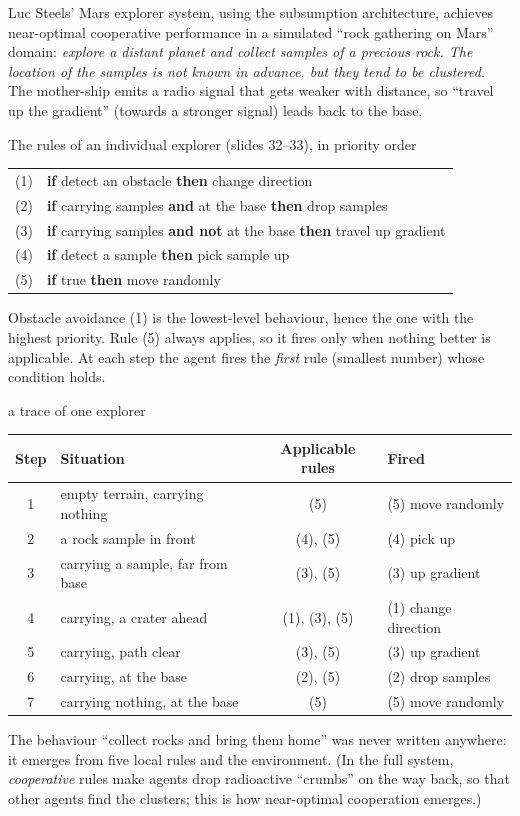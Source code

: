 Luc Steels' Mars explorer system, using the subsumption architecture, achieves near-optimal
cooperative performance in a simulated ``rock gathering on Mars'' domain: \emph{explore a
distant planet and collect samples of a precious rock. The location of the samples is not
known in advance, but they tend to be clustered.} The mother-ship emits a radio signal that
gets weaker with distance, so ``travel up the gradient'' (towards a stronger signal) leads
back to the base.

\begin{nbfact}{The rules of an individual explorer (slides 32--33), in priority order}
\begin{center}
\begin{tabular}{@{}c l@{}}
(1) & \textbf{if} detect an obstacle \textbf{then} change direction \\
(2) & \textbf{if} carrying samples \textbf{and} at the base \textbf{then} drop samples \\
(3) & \textbf{if} carrying samples \textbf{and not} at the base \textbf{then} travel up gradient \\
(4) & \textbf{if} detect a sample \textbf{then} pick sample up \\
(5) & \textbf{if} true \textbf{then} move randomly
\end{tabular}
\end{center}
Obstacle avoidance (1) is the lowest-level behaviour, hence the one with the highest
priority. Rule (5) always applies, so it fires only when nothing better is applicable.
At each step the agent fires the \emph{first} rule (smallest number) whose condition holds.
\end{nbfact}

\begin{nbexample}{a trace of one explorer}
\notinslides
\small
\begin{tabularx}{\linewidth}{@{}c X c l@{}}
\toprule
\textbf{Step} & \textbf{Situation} & \textbf{Applicable rules} & \textbf{Fired} \\
\midrule
1 & empty terrain, carrying nothing & (5) & (5) move randomly \\
2 & a rock sample in front & (4), (5) & (4) pick up \\
3 & carrying a sample, far from base & (3), (5) & (3) up gradient \\
4 & carrying, a crater ahead & (1), (3), (5) & (1) change direction \\
5 & carrying, path clear & (3), (5) & (3) up gradient \\
6 & carrying, at the base & (2), (5) & (2) drop samples \\
7 & carrying nothing, at the base & (5) & (5) move randomly \\
\bottomrule
\end{tabularx}
The behaviour ``collect rocks and bring them home'' was never written anywhere: it emerges
from five local rules and the environment. (In the full system, \emph{cooperative} rules make
agents drop radioactive ``crumbs'' on the way back, so that other agents find the clusters;
this is how near-optimal cooperation emerges.)
\end{nbexample}

